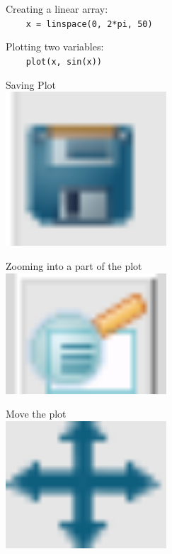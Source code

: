 Creating a linear array:\\
{\ex \lstinline|    x = linspace(0, 2*pi, 50)|}

Plotting two variables:\\
{\ex \lstinline|    plot(x, sin(x))|}

Saving Plot\\
{\includegraphics[width=60mm]{save.png}}

Zooming into a part of the plot\\
{\includegraphics[width=60mm]{zoom.png}}

Move the plot\\
{\includegraphics[width=60mm]{move.png}}
